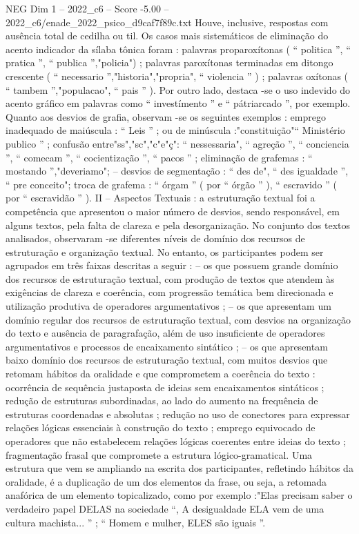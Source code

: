 \begin{textsample}{NEG Dim 1 – 2022\_c6 – Score -5.00 – 2022\_c6/enade\_2022\_psico\_d9caf7f89c.txt}
Houve, inclusive, respostas com ausência total de cedilha ou til.
Os casos mais sistemáticos de eliminação do acento indicador da sílaba tônica foram : palavras proparoxítonas ( “ politica ”, “ pratica ”, “ publica ”,"policia") ; palavras paroxítonas terminadas em ditongo crescente ( “ necessario ”,"historia","propria", “ violencia ” ) ; palavras oxítonas ( “ tambem ”,"populacao", “ pais ” ).
Por outro lado, destaca -se o uso indevido do acento gráfico em palavras como “ investímento ” e “ pátriarcado ”, por exemplo.
Quanto aos desvios de grafia, observam -se os seguintes exemplos : emprego inadequado de maiúscula : “ Leis ” ; ou de minúscula :"constituição"“ Ministério publico ” ; confusão entre"ss","sc","c"e"ç": “ nessessaria", “ agreção ”, “ conciencia ”, “ comecam ”, “ cocientização ”, “ pacos ” ; eliminação de grafemas : “ mostando ”,"deveriamo"; – desvios de segmentação : “ des de", “ des igualdade ”, “ pre conceito"; troca de grafema : “ órgam ” ( por “ órgão ” ), “ escravido ” ( por “ escravidão ” ).
II – Aspectos Textuais : a estruturação textual foi a competência que apresentou o maior número de desvios, sendo responsável, em alguns textos, pela falta de clareza e pela desorganização.
No conjunto dos textos analisados, observaram -se diferentes níveis de domínio dos recursos de estruturação e organização textual.
No entanto, os participantes podem ser agrupados em três faixas descritas a seguir : – os que possuem grande domínio dos recursos de estruturação textual, com produção de textos que atendem às exigências de clareza e coerência, com progressão temática bem direcionada e utilização produtiva de operadores argumentativos ; – os que apresentam um domínio regular dos recursos de estruturação textual, com desvios na organização do texto e ausência de paragrafação, além de uso insuficiente de operadores argumentativos e processos de encaixamento sintático ; – os que apresentam baixo domínio dos recursos de estruturação textual, com muitos desvios que retomam hábitos da oralidade e que comprometem a coerência do texto : ocorrência de sequência justaposta de ideias sem encaixamentos sintáticos ; redução de estruturas subordinadas, ao lado do aumento na frequência de estruturas coordenadas e absolutas ; redução no uso de conectores para expressar relações lógicas essenciais à construção do texto ; emprego equivocado de operadores que não estabelecem relações lógicas coerentes entre ideias do texto ; fragmentação frasal que compromete a estrutura lógico-gramatical.
Uma estrutura que vem se ampliando na escrita dos participantes, refletindo hábitos da oralidade, é a duplicação de um dos elementos da frase, ou seja, a retomada anafórica de um elemento topicalizado, como por exemplo :"Elas precisam saber o verdadeiro papel DELAS na sociedade “, A desigualdade ELA vem de uma cultura machista... ” ; “ Homem e mulher, ELES são iguais ”.

\end{textsample}
